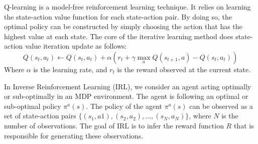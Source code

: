 \documentclass[letterpaper, 10 pt, conference]{ieeeconf}  %
\newcommand\NB[1]{$\spadesuit$\footnote{NB: #1}}
\begin{document}
Q-learning is a model-free reinforcement learning technique. It relies on learning the state-action value function for each state-action pair. By doing so, the optimal policy can be constructed by simply choosing the action that has the highest value at each state. The core of the iterative learning method does state-action value iteration update as follows:
\begin{equation}
    Q(s_t,a_t) \leftarrow Q(s_t,a_t) + \alpha ( r_t + \gamma \max_{a} Q(s_{t+1},a) - Q(s_t,a_t))
\end{equation}
Where $\alpha$ is the learning rate, and $r_t$ is the reward observed at the current state.

In Inverse Reinforcement Learning (IRL), we consider an agent acting optimally or sub-optimally in an MDP environment. The agent is following an optimal or sub-optimal policy $\pi^a(s)$. The policy of the agent $\pi^a(s)$ can be observed as a set of state-action pairs $\{(s_1,a1),(s_2,a_2), ...,(s_N,a_N)\}$, where $N$ is the number of observations. The goal of IRL is to infer the reward function $R$ that is responsible for generating these observations.%
\end{document}
